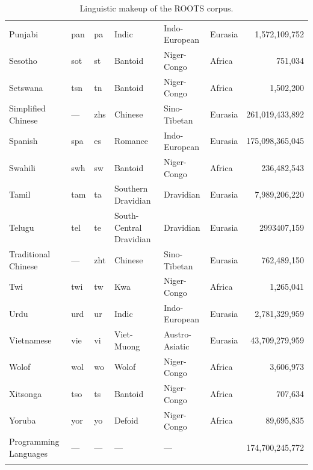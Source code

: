 \begin{table}[]
{\begin{tabular}{lTTlllr}
Punjabi             & pan       & pa          & Indic                   & Indo-European  & Eurasia   & 1,572,109,752    \\
Sesotho             & sot       & st          & Bantoid                 & Niger-Congo    & Africa    & 751,034        \\
Setswana            & tsn       & tn          & Bantoid                 & Niger-Congo    & Africa    & 1,502,200       \\
Simplified Chinese  &     ---      & zhs         & Chinese                 & Sino-Tibetan   & Eurasia   & 261,019,433,892  \\
Spanish             & spa       & es          & Romance                 & Indo-European  & Eurasia   & 175,098,365,045  \\
Swahili             & swh       & sw          & Bantoid                 & Niger-Congo    & Africa    & 236,482,543     \\
Tamil               & tam       & ta          & Southern Dravidian      & Dravidian      & Eurasia   & 7,989,206,220    \\
Telugu              & tel       & te          & South-Central Dravidian & Dravidian      & Eurasia   & 2993407,159    \\
Traditional Chinese &      ---     & zht         & Chinese                 & Sino-Tibetan   & Eurasia   & 762,489,150     \\
Twi                 & twi       & tw          & Kwa                     & Niger-Congo    & Africa    & 1,265,041       \\
Urdu                & urd       & ur          & Indic                   & Indo-European  & Eurasia   & 2,781,329,959    \\
Vietnamese          & vie       & vi          & Viet-Muong              & Austro-Asiatic & Eurasia   & 43,709,279,959   \\
Wolof               & wol       & wo          & Wolof                   & Niger-Congo    & Africa    & 3,606,973       \\

Xitsonga            & tso       & ts          & Bantoid                 & Niger-Congo    & Africa    & 707,634        \\
Yoruba              & yor       & yo          & Defoid                  & Niger-Congo    & Africa    & 89,695,835      \\
Programming Languages                & ---      & ---        & ---                    & ---           &       & 174,700,245,772 \\
\bottomrule \\
\end{tabular}%
}
\caption{Linguistic makeup of the ROOTS corpus.}
\label{tab:language_families}
\end{table}